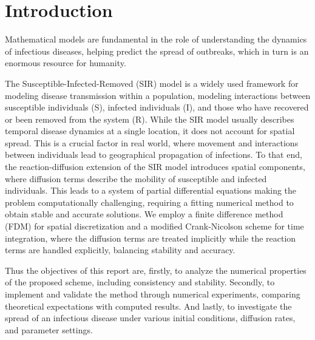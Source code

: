 \section{Introduction}
Mathematical models are fundamental in the role of understanding the dynamics of infectious diseases, 
helping predict the spread of outbreaks, which in turn is an enormous resource for humanity.

The Susceptible-Infected-Removed (SIR) model is a widely used framework for modeling disease transmission within
a population, modeling interactions between susceptible individuals (S), infected individuals (I), and those who
have recovered or been removed from the system (R). While the SIR model usually describes temporal disease 
dynamics at a single location, it does not account for spatial spread. This is a crucial factor in real world,
where movement and interactions between individuals lead to geographical propagation of infections.
To that end, the reaction-diffusion extension of the SIR model introduces spatial components, where diffusion 
terms describe the mobility of susceptible and infected individuals. This leads to a system of partial 
differential equations making the problem computationally challenging, requiring a fitting numerical method 
to obtain stable and accurate solutions. We employ a finite difference method (FDM) for spatial discretization 
and a modified Crank-Nicolson scheme for time integration, where the diffusion terms are treated implicitly 
while the reaction terms are handled explicitly, balancing stability and accuracy.

Thus the objectives of this report are, firstly, to analyze the numerical properties of the proposed scheme, 
including consistency and stability. Secondly, to implement and validate the method through numerical experiments,
comparing theoretical expectations with computed results. And lastly, to investigate the spread of an infectious 
disease under various initial conditions, diffusion rates, and parameter settings.